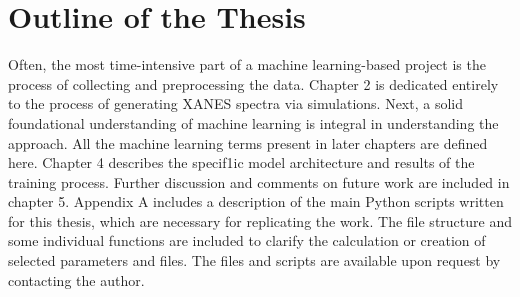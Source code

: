 \section{Outline of the Thesis}
Often, the most time-intensive part of a machine learning-based project is the process of collecting and preprocessing the data. Chapter 2 is dedicated entirely to the process of generating XANES spectra via simulations. Next, a solid foundational understanding of machine learning is integral in understanding the approach. All the machine learning terms present in later chapters are defined here.  Chapter 4 describes the specif1ic model architecture and results of the training process. Further discussion and comments on future work are included in chapter 5. Appendix A includes a description of the main Python scripts written for this thesis, which are necessary for replicating the work. The file structure and some individual functions are included to clarify the calculation or creation of selected parameters and files. The files and scripts are available upon request by contacting the author.
